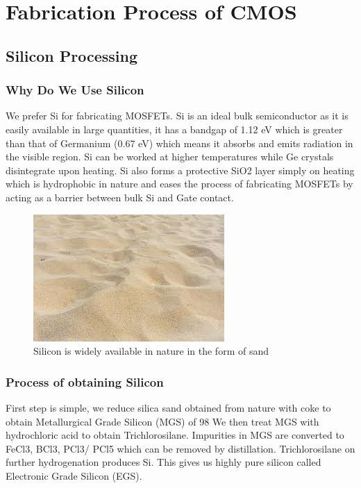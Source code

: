 \chapter{Fabrication Process of CMOS}

\section{Silicon Processing}

\subsection{Why Do We Use Silicon}
We prefer Si for fabricating MOSFETs. Si is an ideal bulk semiconductor as it is easily available in large quantities, it has a bandgap of 1.12 eV which is greater than that of Germanium (0.67 eV) which means it absorbs and emits radiation in the visible region. Si can be worked at higher temperatures while Ge crystals disintegrate upon heating. Si also forms a protective SiO2 layer simply on heating which is hydrophobic in nature and eases the process of fabricating MOSFETs by acting as a barrier between bulk Si and Gate contact.



\begin{figure}[htb]
\centering
\includegraphics[scale=0.6]{./fig1} %
\caption{Silicon is widely available in nature in the form of sand}
\label{3.1} %
\end{figure}

\subsection{Process of obtaining Silicon}
First step is simple, we reduce silica sand obtained from nature with coke to obtain Metallurgical Grade Silicon (MGS) of 98%
We then treat MGS with hydrochloric acid to obtain Trichlorosilane. Impurities in MGS are converted to FeCl3, BCl3, PCl3/ PCl5 which can be removed by distillation. 
Trichlorosilane on further hydrogenation produces Si. This gives us highly pure silicon called Electronic Grade Silicon (EGS).

